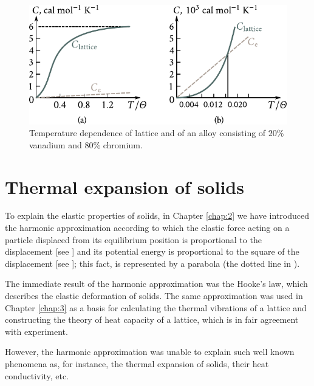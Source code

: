 \begin{figure}[t]
	\begin{center}
		\includegraphics[scale=1]{figures/ch_04/fig_4_6.pdf}
		\caption[]{Temperature dependence of lattice and of an alloy consisting of $20\%$ vanadium and $80\%$ chromium.}
		\label{fig:4_6}
	\end{center}
	\vspace{-0.7cm}
\end{figure}

\section{Thermal expansion of solids}\label{sec:35}

To explain the elastic properties of solids, in Chapter \ref{chap:2} we have introduced the harmonic approximation according to which the elastic force acting on a particle displaced from its equilibrium position is proportional to the displacement [see ] and its potential energy is proportional to the square of the displacement [see ]; this fact, is represented by a parabola (the dotted line in ).

The immediate result of the harmonic approximation was the Hooke's law, which describes the elastic deformation of solids. The same approximation was used in Chapter \ref{chap:3} as a basis for calculating the thermal vibrations of a lattice and constructing the theory of heat capacity of a lattice, which is in fair agreement with experiment.

However, the harmonic approximation was unable to explain such well known phenomena as, for instance, the thermal expansion of solids, their heat conductivity, etc.

